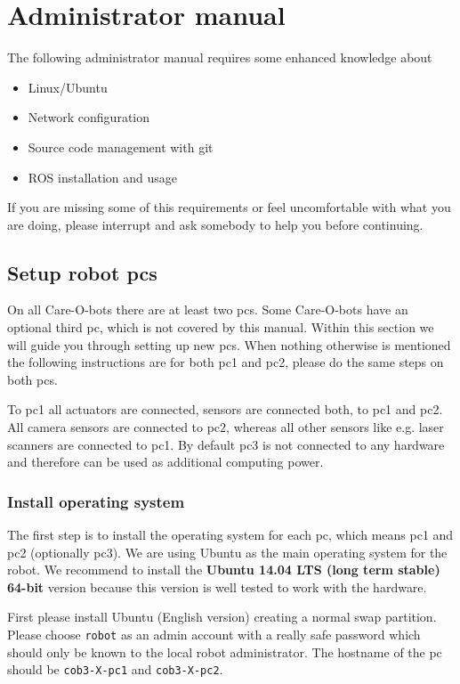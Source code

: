 \chapter{Administrator manual}
\label{chap:admin}

The following administrator manual requires some enhanced knowledge about
\begin{itemize}
\item Linux/Ubuntu
\item Network configuration
\item Source code management with git
\item ROS installation and usage
\end{itemize}
If you are missing some of this requirements or feel uncomfortable with what you are doing, please interrupt and ask somebody to help you before continuing.

\section{Setup robot pcs}
On all Care-O-bots there are at least two pcs. Some Care-O-bots have an optional third pc, which is not covered by this manual. Within this section we will guide you through setting up new pcs. When nothing otherwise is mentioned the following instructions are for both pc1 and pc2, please do the same steps on both pcs.

To pc1 all actuators are connected, sensors are connected both, to pc1 and pc2. All camera sensors are connected to pc2, whereas all other sensors like e.g. laser scanners are connected to pc1. By default pc3 is not connected to any hardware and therefore can be used as additional computing power.

\subsection{Install operating system}
The first step is to install the operating system for each pc, which means pc1 and pc2 (optionally pc3). We are using Ubuntu as the main operating system for the robot. We recommend to install the \textbf{Ubuntu 14.04 LTS (long term stable) 64-bit} version because this version is well tested to work with the hardware. 

First please install Ubuntu (English version) creating a normal swap partition. Please choose \texttt{robot} as an admin account with a really safe password which should only be known to the local robot administrator. The hostname of the pc should be \texttt{cob3-X-pc1} and \texttt{cob3-X-pc2}.

